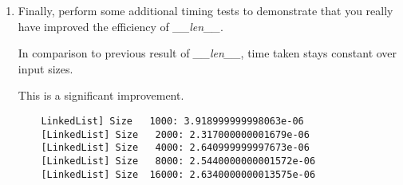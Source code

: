\documentclass[12pt]{article}
\begin{document}
\begin{enumerate}[1.]
    \item Finally, perform some additional timing tests to demonstrate that you really have
    improved the efficiency of \textit{\_\_len\_\_}.

    \begin{mdframed}

    In comparison to previous result of \textit{\_\_len\_\_}, time taken stays
    constant over input sizes.

    \bigskip

    This is a significant improvement.

    \bigskip

    \begin{lstlisting}
    LinkedList] Size   1000: 3.918999999998063e-06
    [LinkedList] Size   2000: 2.317000000001679e-06
    [LinkedList] Size   4000: 2.640999999997673e-06
    [LinkedList] Size   8000: 2.5440000000001572e-06
    [LinkedList] Size  16000: 2.6340000000013575e-06
    \end{lstlisting}
    \end{mdframed}

\end{enumerate}
\end{document}
